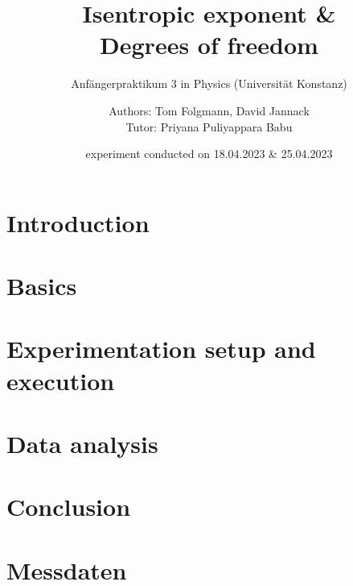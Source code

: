 \documentclass[oneside, footinclude=off, captions=tableheading, DIV=12;usenames,dvipsnames,english]{scrartcl}
\begin{document}
    \title{Isentropic exponent \& \\ Degrees of freedom}
    \subtitle{Anfängerpraktikum 3 in Physics (Universität Konstanz)}
    \author{Authors: Tom Folgmann, David Jannack \\ \large{Tutor: Priyana Puliyappara Babu}}
    \date{experiment conducted on 18.04.2023 \& 25.04.2023}
    \maketitle
    \thispagestyle{empty}
    \section*{Introduction}
        

    \newpage


    \tableofcontents
    \thispagestyle{empty}	
    \newpage
    \setcounter{page}{1}


\newpage
\section{Basics}
    
    
	

\newpage
\section{Experimentation setup and execution}
    

\newpage
\section{Data analysis}
    

\newpage
\section{Conclusion}
    


\newpage
    
\newpage
    \listoffigures
    \listoftables


\newpage
    \section*{Messdaten}
    
\newpage
    



%
\end{document}
